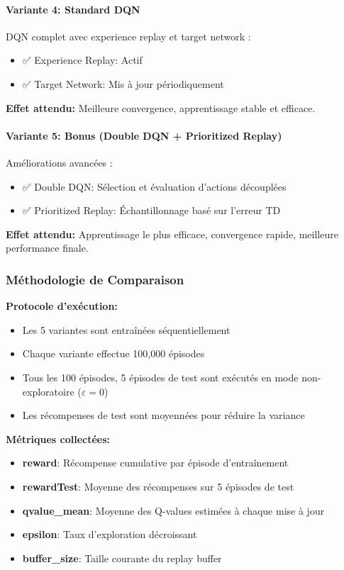 \paragraph{Variante 4: Standard DQN}

DQN complet avec experience replay et target network :
\begin{itemize}
    \item ✅ Experience Replay: Actif
    \item ✅ Target Network: Mis à jour périodiquement
\end{itemize}

\textbf{Effet attendu:} Meilleure convergence, apprentissage stable et efficace.

\paragraph{Variante 5: Bonus (Double DQN + Prioritized Replay)}

Améliorations avancées :
\begin{itemize}
    \item ✅ Double DQN: Sélection et évaluation d'actions découplées
    \item ✅ Prioritized Replay: Échantillonnage basé sur l'erreur TD
\end{itemize}

\textbf{Effet attendu:} Apprentissage le plus efficace, convergence rapide, meilleure performance finale.

\subsubsection{Méthodologie de Comparaison}

\textbf{Protocole d'exécution:}
\begin{itemize}
    \item Les 5 variantes sont entraînées séquentiellement
    \item Chaque variante effectue 100,000 épisodes
    \item Tous les 100 épisodes, 5 épisodes de test sont exécutés en mode non-exploratoire ($\varepsilon = 0$)
    \item Les récompenses de test sont moyennées pour réduire la variance
\end{itemize}

\textbf{Métriques collectées:}
\begin{itemize}
    \item \textbf{reward}: Récompense cumulative par épisode d'entraînement
    \item \textbf{rewardTest}: Moyenne des récompenses sur 5 épisodes de test
    \item \textbf{qvalue\_mean}: Moyenne des Q-values estimées à chaque mise à jour
    \item \textbf{epsilon}: Taux d'exploration décroissant
    \item \textbf{buffer\_size}: Taille courante du replay buffer
\end{itemize}

